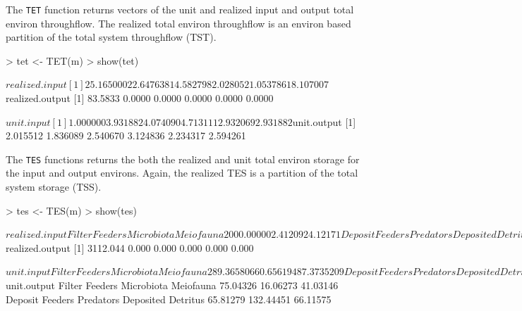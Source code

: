 \documentclass[article]{jss}
\begin{document}
The \texttt{TET} function returns vectors of the unit and realized
input and output total environ throughflow.  The realized total
environ throughflow is an environ based partition of the total system
throughflow (TST).

\begin{Schunk}
\begin{Sinput}
> tet <- TET(m)
> show(tet)
\end{Sinput}
\begin{Soutput}
$realized.input
[1] 25.165000 22.647638 14.582798  2.028052  1.053786 18.107007

$realized.output
[1] 83.5833  0.0000  0.0000  0.0000  0.0000  0.0000

$unit.input
[1] 1.000000 3.931882 4.074090 4.713111 2.932069 2.931882

$unit.output
[1] 2.015512 1.836089 2.540670 3.124836 2.234317 2.594261
\end{Soutput}
\end{Schunk}

The \texttt{TES} functions returns the both the realized and unit
total environ storage for the input and output environs.  Again, the
realized TES is a partition of the total system storage (TSS).

\begin{Schunk}
\begin{Sinput}
> tes <- TES(m)
> show(tes)
\end{Sinput}
\begin{Soutput}
$realized.input
    Filter Feeders         Microbiota          Meiofauna 
        2000.00000            2.41209           24.12171 
   Deposit Feeders          Predators Deposited Detritus 
          16.27440           69.23803         1000.03118 

$realized.output
[1] 3112.044    0.000    0.000    0.000    0.000    0.000

$unit.input
    Filter Feeders         Microbiota          Meiofauna 
       289.3658066          0.6561948          7.3735209 
   Deposit Feeders          Predators Deposited Detritus 
        11.5308112        109.7205293        265.1036470 

$unit.output
    Filter Feeders         Microbiota          Meiofauna 
          75.04326           16.06273           41.03146 
   Deposit Feeders          Predators Deposited Detritus 
          65.81279          132.44451           66.11575 
\end{Soutput}
\end{Schunk}
\end{document}
